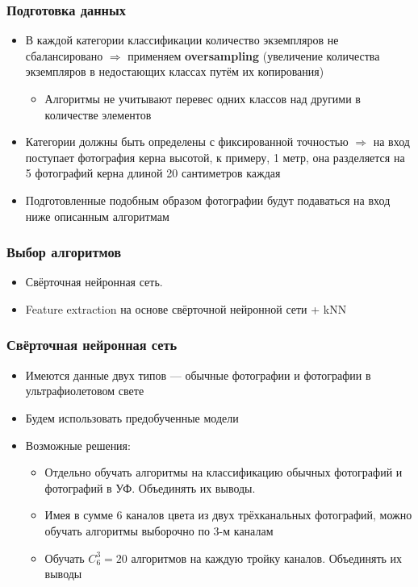 \documentclass[xetex,mathserif,serif]{beamer}
\begin{document}
	\begin{frame}
		\frametitle{Подготовка данных}
		
        \begin{itemize}
            \item В каждой категории классификации количество экземпляров не сбалансировано $\Rightarrow$ применяем \textbf{oversampling} (увеличение количества экземпляров в недостающих классах путём их копирования)
                \begin{itemize}
                    \item Алгоритмы не учитывают перевес одних классов над другими в количестве элементов
                \end{itemize}
            \item Категории должны быть определены с фиксированной точностью $\Rightarrow$ на вход поступает фотография керна высотой, к примеру, 1 метр, она разделяется на 5 фотографий керна длиной 20 сантиметров каждая
            \item Подготовленные подобным образом фотографии будут подаваться на вход ниже описанным алгоритмам
        \end{itemize} 
        
	\end{frame}	

        
	\begin{frame}
		\frametitle{Выбор алгоритмов}
		
        \begin{itemize}
            \item Свёрточная нейронная сеть.
            \item Feature extraction на основе свёрточной нейронной сети + kNN
        \end{itemize} 
        
	\end{frame}	
	
	
	\begin{frame}
		\frametitle{Свёрточная нейронная сеть}
		
        \begin{itemize}
            \item Имеются данные двух типов — обычные фотографии и фотографии в ультрафиолетовом свете
            \item Будем использовать предобученные модели
            \item Возможные решения:
                \begin{itemize}
                    \item Отдельно обучать алгоритмы на классификацию обычных фотографий и фотографий в УФ. Объединять их выводы.
                    \item Имея в сумме 6 каналов цвета из двух трёхканальных фотографий, можно обучать алгоритмы выборочно по 3-м каналам
                    \item Обучать $C_{6}^{3}=20$ алгоритмов на каждую тройку каналов. Объединять их выводы
                \end{itemize}
        \end{itemize} 
        
	\end{frame}	
	
\end{document}

